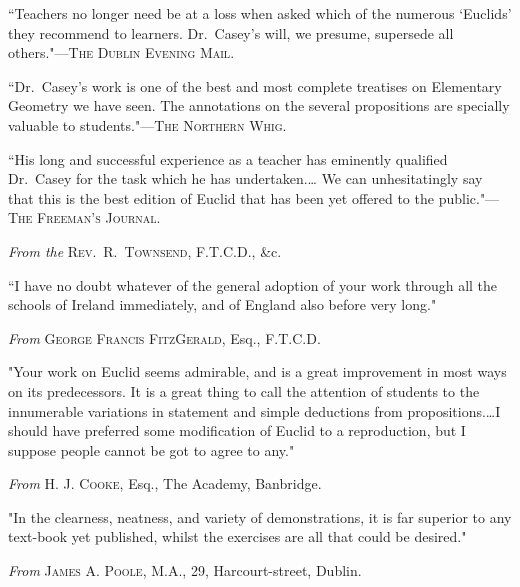 \documentclass[oneside]{book}
\begin{document}
\begin{footnotesize}
\medskip
``Teachers no longer need be at a loss when asked which of
the numerous `Euclids' they recommend to learners. Dr.~Casey's
will, we presume, supersede all others."---\textsc{The Dublin Evening
Mail}.

\medskip
``Dr.~Casey's work is one of the best and most complete
treatises on Elementary Geometry we have seen. The annotations
on the several propositions are specially valuable to students."---\textsc{The
Northern Whig}.

\medskip
``His long and successful experience as a teacher has eminently
qualified Dr.~Casey for the task which he has undertaken.\ldots
We can unhesitatingly say that this is the best edition of Euclid
that has been yet offered to the public."---\textsc{The Freeman's
Journal}.

\medskip
\begin{center}
\textit{From the} \textsc{Rev.\ R.~Townsend, F.T.C.D.}, \&c.
\end{center}
\nopagebreak

``I have no doubt whatever of the general adoption of your
work through all the schools of Ireland immediately, and of
England also before very long."

\medskip
\begin{center}
\textit{From} \textsc{George Francis FitzGerald}, Esq., F.T.C.D.
\end{center}
\nopagebreak

"Your work on Euclid seems admirable, and is a great improvement
in most ways on its predecessors. It is a great thing
to call the attention of students to the innumerable variations in
statement and simple deductions from propositions.\ldots I should
have preferred some modification of Euclid to a reproduction, but
I suppose people cannot be got to agree to any."

\pagebreak
\begin{center}
\textit{From} \textsc{H. J. Cooke}, Esq., The Academy, Banbridge.
\end{center}
\nopagebreak

"In the clearness, neatness, and variety of demonstrations, it
is far superior to any text-book yet published, whilst the exercises
are all that could be desired."

\medskip
\begin{center}
\textit{From} \textsc{James A. Poole}, M.A., 29, Harcourt-street, Dublin.
\end{center}
\nopagebreak


\end{footnotesize}
\end{document}
